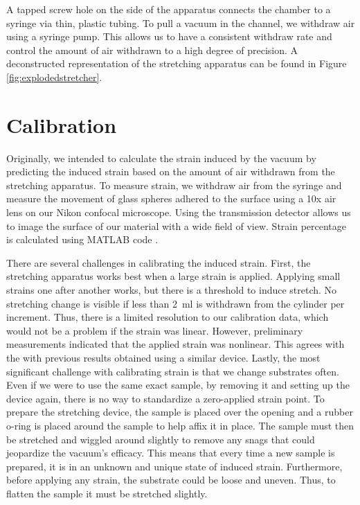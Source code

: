A tapped screw hole on the side of the apparatus connects the chamber to a syringe via thin, plastic tubing. To pull a vacuum in the channel, we withdraw air using a syringe pump. This allows us to have a consistent withdraw rate and control the amount of air withdrawn to a high degree of precision. A deconstructed representation of the stretching apparatus can be found in Figure \ref{fig:explodedstretcher}.

\section{Calibration}
Originally, we intended to calculate the strain induced by the vacuum by predicting the induced strain based on the amount of air withdrawn from the stretching apparatus. To measure strain, we withdraw air from the syringe and measure the movement of glass spheres adhered to the surface using a 10x air lens on our Nikon confocal microscope. Using the transmission detector allows us to image the surface of our material with a wide field of view. Strain percentage is calculated using MATLAB code \cite{xu2017direct}.

There are several challenges in calibrating the induced strain. First, the stretching apparatus works best when a large strain is applied. Applying small strains one after another works, but there is a threshold to induce stretch. No stretching change is visible if less than 2~ml is withdrawn from the cylinder per increment. Thus, there is a limited resolution to our calibration data, which would not be a problem if the strain was linear. However, preliminary measurements indicated that the applied strain was nonlinear. This agrees with the with previous results \cite{na2008time} obtained using a similar device. Lastly, the most significant challenge with calibrating strain is that we change substrates often. Even if we were to use the same exact sample, by removing it and setting up the device again, there is no way to standardize a zero-applied strain point. To prepare the stretching device, the sample is placed over the opening and a rubber o-ring is placed around the sample to help affix it in place. The sample must then be stretched and wiggled around slightly to remove any snags that could jeopardize the vacuum's efficacy. This means that every time a new sample is prepared, it is in an unknown and unique state of induced strain. Furthermore, before applying any strain, the substrate could be loose and uneven. Thus, to flatten the sample it must be stretched slightly.

